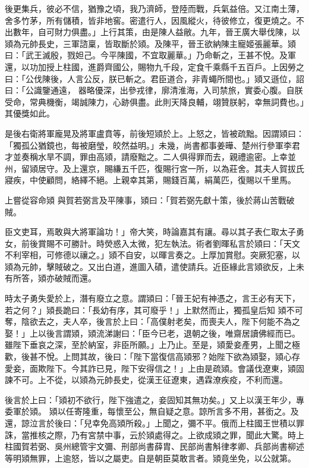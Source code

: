 \begin{pinyinscope}
 後更集兵，彼必不信，猶豫之頃，我乃濟師，登陸而戰，兵氣益倍。又江南土薄，舍多竹茅，所有儲積，皆非地窖。密遣行人，因風縱火，待彼修立，復更燒之。不出數年，自可財力俱盡。」上行其策，由是陳人益敝。九年，晉王廣大舉伐陳，以熲為元帥長史，三軍諮稟，皆取斷於熲。及陳平，晉王欲納陳主寵姬張麗華。熲曰：「武王滅殷，戮妲己。今平陳國，不宜取麗華。」乃命斬之，王甚不悅。及軍還，以功加授上柱國，進爵齊國公，賜物九千段，定食千乘縣千五百戶。上因勞之曰：「公伐陳後，人言公反，朕已斬之。君臣道合，非青蠅所間也。」熲又遜位，詔曰：「公識鑒通遠，
 器略優深，出參戎律，廓清淮海，入司禁旅，實委心腹。自朕受命，常典機衡，竭誠陳力，心跡俱盡。此則天降良輔，翊贊朕躬，幸無詞費也。」其優獎如此。



 是後右衛將軍龐晃及將軍盧賁等，前後短熲於上。上怒之，皆被疏黜。因謂熲曰：「獨孤公猶鏡也，每被磨瑩，皎然益明。」未幾，尚書都事姜曄、楚州行參軍李君才並奏稱水旱不調，罪由高熲，請廢黜之。二人俱得罪而去，親禮逾密。上幸並州，留熲居守。及上還京，賜縑五千匹，復賜行宮一所，以為莊舍。其夫人賀拔氏寢疾，中使顧問，絡繹不絕。上親幸其第，賜錢百萬，絹萬匹，復賜以千里馬。



 上嘗從容命熲
 與賀若弼言及平陳事，熲曰：「賀若弼先獻十策，後於蔣山苦戰破賊。



 臣文吏耳，焉敢與大將軍論功！」帝大笑，時論嘉其有讓。尋以其子表仁取太子勇女，前後賞賜不可勝計。時熒惑入太微，犯左執法。術者劉暉私言於熲曰：「天文不利宰相，可修德以禳之。」熲不自安，以暉言奏之。上厚加賞慰。突厥犯塞，以熲為元帥，擊賊破之。又出白道，進圖入磧，遣使請兵。近臣緣此言熲欲反，上未有所答，熲亦破賊而還。



 時太子勇失愛於上，潛有廢立之意。謂熲曰：「晉王妃有神憑之，言王必有天下，若之何？」熲長跪曰：「長幼有序，其可廢乎！」上默然而止，獨孤皇后知
 熲不可奪，陰欲去之，夫人卒，後言於上曰：「高僕射老矣，而喪夫人，陛下何能不為之娶！」上以後言謂熲，熲流涕謝曰：「臣今已老，退朝之後，唯齋居讀佛經而已。雖陛下垂哀之深，至於納室，非臣所願。」上乃止。至是，熲愛妾產男，上聞之極歡，後甚不悅。上問其故，後曰：「陛下當復信高熲邪？始陛下欲為熲娶，熲心存愛妾，面欺陛下。今其詐已見，陛下安得信之！」上由是疏熲。會議伐遼東，熲固諫不可。上不從，以熲為元帥長史，從漢王征遼東，遇霖潦疾疫，不利而還。



 後言於上曰：「熲初不欲行，陛下強遣之，妾固知其無功矣。」又上以漢王年少，專委軍於熲。
 熲以任寄隆重，每懷至公，無自疑之意。諒所言多不用，甚銜之。及還，諒泣言於後曰：「兒幸免高熲所殺。」上聞之，彌不平。俄而上柱國王世積以罪誅，當推核之際，乃有宮禁中事，云於熲處得之。上欲成熲之罪，聞此大驚。時上柱國賀若弼、吳州總管宇文彌、刑部尚書薛胄、民部尚書斛律孝卿、兵部尚書柳述等明熲無罪，上逾怒，皆以之屬吏。自是朝臣莫敢言者。熲竟坐免，以公就第。




\end{pinyinscope}
